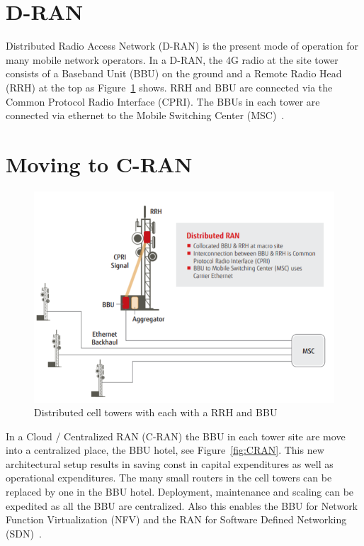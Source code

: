 \section{D-RAN}
Distributed Radio Access Network (D-RAN) is the present mode of operation for many mobile network operators.
In a D-RAN, the 4G radio at the site tower consists of a Baseband Unit (BBU) on the ground and a Remote Radio Head (RRH)
at the top as Figure~\ref{fig:DRAN} shows. RRH and BBU are connected via the Common Protocol Radio Interface (CPRI).
The BBUs in each tower are connected via ethernet to the Mobile Switching Center (MSC)~\cite{fujitsu}. 

\section{Moving to C-RAN}
\label{sec:moving_to_cran}

\begin{figure}[h]
    \centering
    \includegraphics[width=1\textwidth]{figures/DRAN.png}
    \caption{Distributed cell towers with each with a RRH and BBU~\cite{fujitsu}}
    \label{fig:DRAN}
\end{figure}

In a Cloud / Centralized RAN (C-RAN) the BBU in each tower site are move into a centralized place, the BBU hotel, see Figure~\ref{fig:CRAN}.
This new architectural setup results in saving const in capital expenditures as well as operational expenditures. The many small routers in the cell towers
can be replaced by one in the BBU hotel. Deployment, maintenance and scaling can be expedited as all the BBU are centralized.
Also this enables the BBU for Network Function Virtualization (NFV) and the RAN for Software Defined Networking (SDN)~\cite{fujitsu}.

